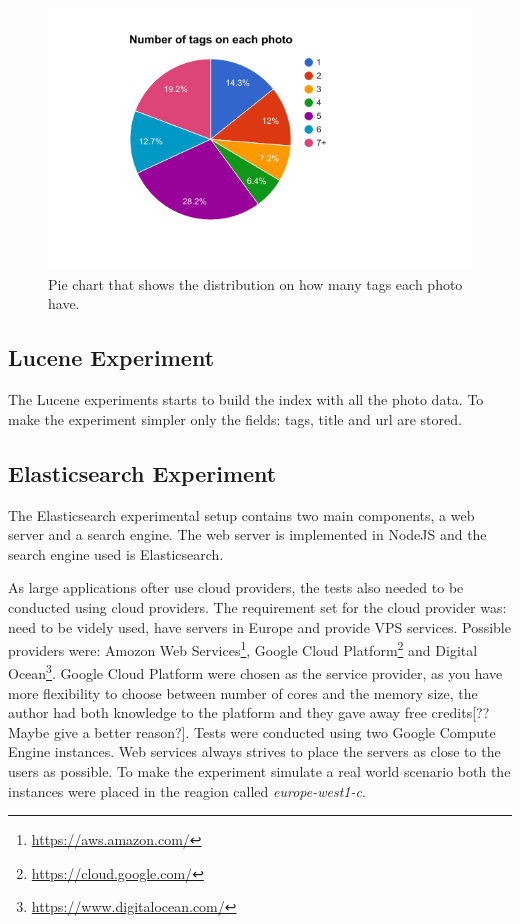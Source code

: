 \begin{figure}[h!]
  \centering \includegraphics[width=1\linewidth]{img/number-of-tags-distribution.png}
  \caption{Pie chart that shows the distribution on how many tags each photo have.}
  \label{fig:pie-chart-tag-distribution}
\end{figure}

\subsection{Lucene Experiment}
The Lucene experiments starts to build the index with all the photo data.
To make the experiment simpler only the fields: tags, title and url are stored.

\subsection{Elasticsearch Experiment}
The Elasticsearch experimental setup contains two main components, a web server and a search engine.
The web server is implemented in NodeJS and the search engine used is Elasticsearch.

As large applications ofter use cloud providers, the tests also needed to be conducted using cloud providers.
The requirement set for the cloud provider was: need to be videly used, have servers in Europe and provide VPS services.
Possible providers were: Amozon Web Services\footnote{\url{https://aws.amazon.com/}},
Google Cloud Platform\footnote{\url{https://cloud.google.com/}} and Digital Ocean\footnote{\url{https://www.digitalocean.com/}}.
Google Cloud Platform were chosen as the service provider, as you have more flexibility to choose between number of cores and the memory size,
the author had both knowledge to the platform and they gave away free credits[?? Maybe give a better reason?].
Tests were conducted using two Google Compute Engine instances.
Web services always strives to place the servers as close to the users as possible.
To make the experiment simulate a real world scenario both the instances were placed in the reagion called \textit{europe-west1-c}.

